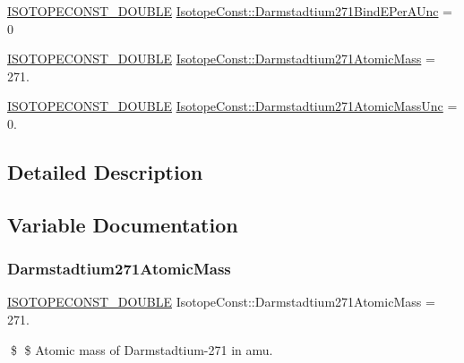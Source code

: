 \begin{DoxyCompactItemize}
\item 
\mbox{\hyperlink{group___isotope_const-_macros_ga8f45a7272ce02c0b4c65c44636ed719a}{I\+S\+O\+T\+O\+P\+E\+C\+O\+N\+S\+T\+\_\+\+D\+O\+U\+B\+LE}} \mbox{\hyperlink{group___isotope_const-_darmstadtium-_ds271_ga085962f7ef4c2b8bee94cb75bc615491}{Isotope\+Const\+::\+Darmstadtium271\+Bind\+E\+Per\+A\+Unc}} = 0
\item 
\mbox{\hyperlink{group___isotope_const-_macros_ga8f45a7272ce02c0b4c65c44636ed719a}{I\+S\+O\+T\+O\+P\+E\+C\+O\+N\+S\+T\+\_\+\+D\+O\+U\+B\+LE}} \mbox{\hyperlink{group___isotope_const-_darmstadtium-_ds271_ga7da86718002f546a703d957d8a70d693}{Isotope\+Const\+::\+Darmstadtium271\+Atomic\+Mass}} = 271.
\item 
\mbox{\hyperlink{group___isotope_const-_macros_ga8f45a7272ce02c0b4c65c44636ed719a}{I\+S\+O\+T\+O\+P\+E\+C\+O\+N\+S\+T\+\_\+\+D\+O\+U\+B\+LE}} \mbox{\hyperlink{group___isotope_const-_darmstadtium-_ds271_gaf29094e3b5c18e9aae087c6b73efe584}{Isotope\+Const\+::\+Darmstadtium271\+Atomic\+Mass\+Unc}} = 0.
\end{DoxyCompactItemize}


\subsection{Detailed Description}


\subsection{Variable Documentation}
\mbox{\label{group___isotope_const-_darmstadtium-_ds271_ga7da86718002f546a703d957d8a70d693}} 
\subsubsection{\texorpdfstring{Darmstadtium271\+Atomic\+Mass}{Darmstadtium271AtomicMass}}
{\footnotesize\ttfamily \mbox{\hyperlink{group___isotope_const-_macros_ga8f45a7272ce02c0b4c65c44636ed719a}{I\+S\+O\+T\+O\+P\+E\+C\+O\+N\+S\+T\+\_\+\+D\+O\+U\+B\+LE}} Isotope\+Const\+::\+Darmstadtium271\+Atomic\+Mass = 271.}

\$ \$ Atomic mass of Darmstadtium-\/271 in amu. \mbox{\label{group___isotope_const-_darmstadtium-_ds271_gaf29094e3b5c18e9aae087c6b73efe584}} 
